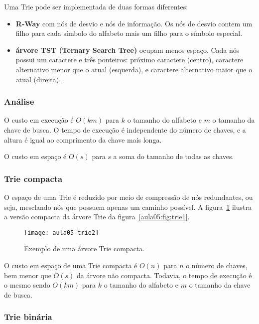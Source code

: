 Uma Trie pode ser implementada de duas formas diferentes:
\begin{itemize}
\item \textbf{R-Way} com nós de desvio e nós de informação. Os nós de desvio contem um filho para
cada símbolo do alfabeto mais um filho para o símbolo especial.

\item {\bf árvore TST (Ternary Search Tree)} ocupam menos espaço.
Cada nós possui um caractere e três ponteiros: próximo caractere (centro), 
caractere alternativo menor que o atual (esquerda), e caractere alternativo
maior que o atual (direita).
\end{itemize}

\subsubsection{Análise}

O custo em execução é $O(k m)$ para $k$ o tamanho do alfabeto e $m$ o tamanho da 
chave de busca.
O tempo de execução é independente do número de chaves, e a altura é igual ao comprimento da chave
mais longa.

O custo em espaço é $O(s)$ para $s$ a soma do tamanho de todas as chaves. 

\subsubsection{Trie compacta}

O espaço de uma Trie é reduzido por meio de compressão de nós redundantes, ou seja,
mesclando nós que possuem apenas um caminho possível.
A figura~\ref{aula05:fig:trie2} ilustra a versão compacta da  árvore Trie 
da figura~\ref{aula05:fig:trie1}.
%
\begin{figure}[ht]
\centering
\texttt{[image: aula05-trie2]}
\caption{Exemplo de uma árvore Trie compacta.}
\label{aula05:fig:trie2}
\end{figure}

O custo em espaço de uma Trie compacta é $O(n)$ para $n$ o número de chaves, bem menor
que $O(s)$ da árvore não compacta. 
Todavia, o tempo de execução é o mesmo sendo $O(k m)$ para $k$ o tamanho do alfabeto e $m$
o tamanho da chave de busca.

\subsubsection{Trie binária}

